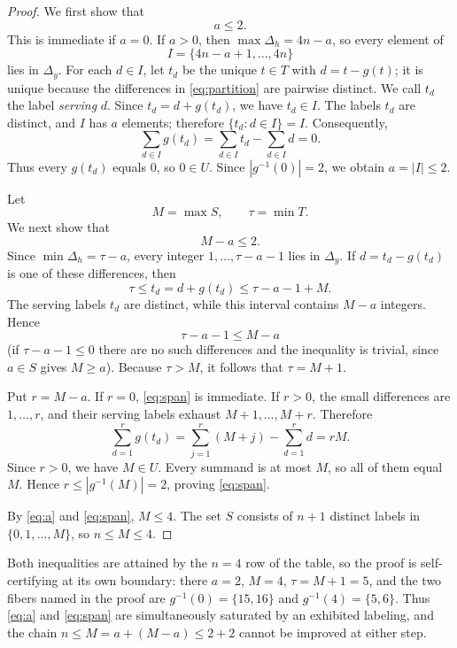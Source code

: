 \documentclass[11pt]{amsart}
\begin{document}
\begin{proof}
We first show that
\begin{equation}\label{eq:a}
  a\le2.
\end{equation}
This is immediate if $a=0$. If $a>0$, then
$\max\Delta_h=4n-a$, so every element of
\[
  I=\{4n-a+1,\dots,4n\}
\]
lies in $\Delta_y$. For each $d\in I$, let $t_d$ be the unique $t\in T$ with $d=t-g(t)$; it
is unique because the differences in \eqref{eq:partition} are pairwise
distinct. We call $t_d$ the label \emph{serving} $d$. Since
$t_d=d+g(t_d)$, we have $t_d\in I$. The labels
$t_d$ are distinct, and $I$ has $a$ elements; therefore
$\{t_d:d\in I\}=I$. Consequently,
\[
  \sum_{d\in I}g(t_d)
  =\sum_{d\in I}t_d-\sum_{d\in I}d=0.
\]
Thus every $g(t_d)$ equals $0$, so $0\in U$. Since
$|g^{-1}(0)|=2$, we obtain $a=|I|\le2$.

Let
\[
  M=\max S,
  \qquad
  \tau=\min T.
\]
We next show that
\begin{equation}\label{eq:span}
  M-a\le2.
\end{equation}
Since $\min\Delta_h=\tau-a$, every integer
$1,\dots,\tau-a-1$ lies in $\Delta_y$. If
$d=t_d-g(t_d)$ is one of these differences, then
\[
  \tau\le t_d=d+g(t_d)\le\tau-a-1+M.
\]
The serving labels $t_d$ are distinct, while this interval contains
$M-a$ integers. Hence
\[
  \tau-a-1\le M-a
\]
(if $\tau-a-1\le0$ there are no such differences and the inequality is
trivial, since $a\in S$ gives $M\ge a$). Because $\tau>M$, it follows
that $\tau=M+1$.

Put $r=M-a$. If $r=0$, \eqref{eq:span} is immediate. If $r>0$, the
small differences are $1,\dots,r$, and their serving labels exhaust
$M+1,\dots,M+r$. Therefore
\[
  \sum_{d=1}^{r}g(t_d)
  =\sum_{j=1}^{r}(M+j)-\sum_{d=1}^{r}d
  =rM.
\]
Since $r>0$, we have $M\in U$. Every summand is at most $M$, so all
of them equal $M$. Hence $r\le|g^{-1}(M)|=2$, proving
\eqref{eq:span}.

By \eqref{eq:a} and \eqref{eq:span}, $M\le4$. The set $S$ consists of
$n+1$ distinct labels in $\{0,1,\dots,M\}$, so $n\le M\le4$.
\end{proof}

Both inequalities are attained by the $n=4$ row of the table, so the
proof is self-certifying at its own boundary: there $a=2$, $M=4$,
$\tau=M+1=5$, and the two fibers named in the proof are
$g^{-1}(0)=\{15,16\}$ and $g^{-1}(4)=\{5,6\}$. Thus \eqref{eq:a} and
\eqref{eq:span} are simultaneously saturated by an exhibited labeling,
and the chain $n\le M=a+(M-a)\le2+2$ cannot be improved at either step.
\end{document}
